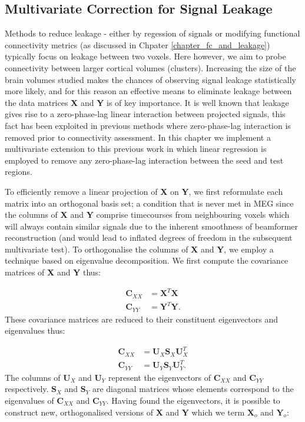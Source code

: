\subsection{Multivariate Correction for Signal Leakage}\label{sec_multivar_leak}
Methods to reduce leakage - either by regession of signals or modifying functional connectivity metrics (as discussed in Chpater \ref{chapter_fc_and_leakage}) typically focus on leakage between two voxels. Here however, we aim to probe connectivity between larger cortical volumes (clusters). Increasing the size of the brain volumes studied makes the chances of observing signal leakage statistically more likely, and for this reason an effective means to eliminate leakage between the data matrices \textbf{X} and \textbf{Y} is of key importance. It is well known that leakage gives rise to a zero-phase-lag linear interaction between projected signals, this fact has been exploited in previous methods \citep{Nolte2004,Stam2007,Brookes2012b,Hipp2012} where zero-phase-lag interaction is removed prior to connectivity assessment. In this chapter we implement a multivariate extension to this previous work \citep{Brookes2012b,Hipp2012} in which linear regression is employed to remove any zero-phase-lag interaction between the seed and test regions. 

To efficiently remove a linear projection of \textbf{X} on \textbf{Y}, we first reformulate each matrix into an orthogonal basis set; a condition that is never met in MEG since the columns of \textbf{X} and \textbf{Y} comprise timecourses from neighbouring voxels which will always contain similar signals due to the inherent smoothness of beamformer reconstruction (and would lead to inflated degrees of freedom in the subsequent multivariate test). To orthogonalise the columns of \textbf{X} and  \textbf{Y}, we employ a technique based on eigenvalue decomposition. We first compute the covariance matrices of \textbf{X} and \textbf{Y} thus:

\begin{align}
\mathbf{C}_{XX} &= \mathbf{X}^T\mathbf{X} \\
\mathbf{C}_{YY} &= \mathbf{Y}^T\mathbf{Y}.
\end{align} These covariance matrices are reduced to their constituent eigenvectors and eigenvalues thus:

\begin{align}
\mathbf{C}_{XX} &= \mathbf{U}_X\mathbf{S}_X\mathbf{U}_X^T \\
\mathbf{C}_{YY} &= \mathbf{U}_Y\mathbf{S}_Y\mathbf{U}_Y^T.
\end{align} The columns of $\mathbf{U}_X$ and $\mathbf{U}_Y$ represent the eigenvectors of $\mathbf{C}_{XX}$ and $\mathbf{C}_{YY}$ respectively. $\mathbf{S}_X$ and  $\mathbf{S}_Y$ are diagonal matrices whose elements correspond to the eigenvalues of $\mathbf{C}_{XX}$ and $\mathbf{C}_{YY}$. Having found the eigenvectors, it is possible to construct new, orthogonalised versions of \textbf{X} and \textbf{Y} which we term $\mathbf{X}_o$ and  $\mathbf{Y}_o$:

